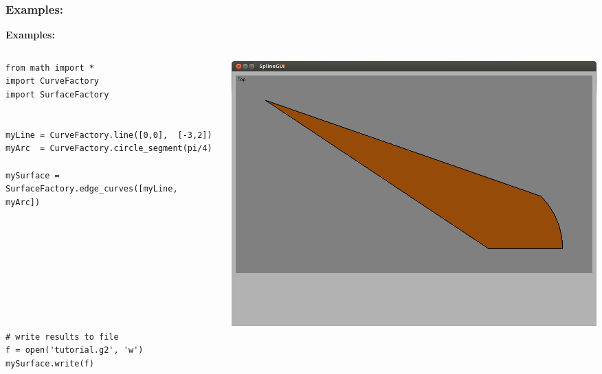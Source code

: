 \documentclass{beamer}
\theoremstyle{plain}
\theoremstyle{definition}
\begin{document}

\begin{frame}[fragile]
\frametitle{Examples:}
\textbf{Examples:}
\begin{columns}
    \begin{column}{.50\linewidth}
        \begin{listing}[H]
            \tiny
            \begin{verbatim}
from math import *
import CurveFactory                                                            
import SurfaceFactory                                                            

                                                                               
myLine = CurveFactory.line([0,0],  [-3,2])                                   
myArc  = CurveFactory.circle_segment(pi/4)                                     

mySurface = SurfaceFactory.edge_curves([myLine, myArc])








                                                                               
# write results to file                                                        
f = open('tutorial.g2', 'w')                                                   
mySurface.write(f)

            \end{verbatim}
        \end{listing}
    \end{column}
    \begin{column}{.45\linewidth}
        \includegraphics[width=\linewidth]{tutorial2}
    \end{column}
\end{columns}

\end{frame}
\end{document}
